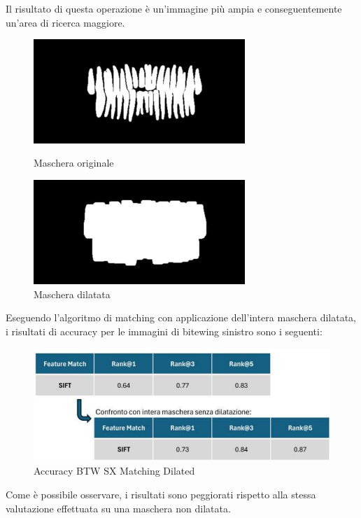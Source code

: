 \documentclass[12pt,a4paper,openright,twoside]{book}
\begin{document}
Il risultato di questa operazione è un'immagine più ampia e conseguentemente un'area di ricerca maggiore.
\begin{figure}[H]
    \centering
    \begin{minipage}{0.45\textwidth}
	\centering
    	\includegraphics[width=8cm]{figures/OPT_8.pdf}
    	\caption{Maschera originale}
    	\label{lab:Maschera Originale}
    \end{minipage}\hfill
    \begin{minipage}{0.45\textwidth}
    	\centering
    	\includegraphics[width=8cm]{figures/OPT_8_mask.pdf}
    	\caption{Maschera dilatata}
    	\label{lab:Maschera dilatata}
    \end{minipage}\hfill
\end{figure}

Eseguendo l'algoritmo di matching con applicazione dell'intera maschera dilatata, i risultati di accuracy per le immagini di bitewing sinistro sono i seguenti:
\begin{figure}[H]
	\centering
	\includegraphics{figures/sx6_1.pdf}
    	\caption{Accuracy BTW SX Matching Dilated}
	\label{fig:sx6}
\end{figure}
Come è possibile osservare, i risultati sono peggiorati rispetto alla stessa valutazione effettuata su una maschera non dilatata.\\
\end{document}
